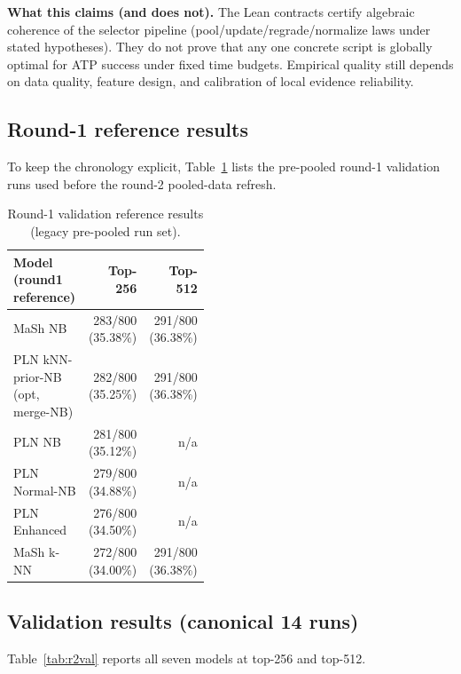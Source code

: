 \documentclass[11pt]{article}
\begin{document}
\noindent
\textbf{What this claims (and does not).}
The Lean contracts certify algebraic coherence of the selector pipeline
(pool/update/regrade/normalize laws under stated hypotheses). They do not prove
that any one concrete script is globally optimal for ATP success under fixed
time budgets. Empirical quality still depends on data quality, feature design,
and calibration of local evidence reliability.

\subsection{Round-1 reference results}
To keep the chronology explicit, Table~\ref{tab:r1val} lists the pre-pooled
round-1 validation runs used before the round-2 pooled-data refresh.

\begin{table}[h]
\centering
\begin{scriptsize}
\begin{tabular}{p{0.44\linewidth}rr}
\hline
Model (round1 reference) & Top-256 & Top-512 \\
\hline
MaSh NB & 283/800 (35.38\%) & 291/800 (36.38\%) \\
PLN kNN-prior-NB (opt, merge-NB) & 282/800 (35.25\%) & 291/800 (36.38\%) \\
PLN NB & 281/800 (35.12\%) & n/a \\
PLN Normal-NB & 279/800 (34.88\%) & n/a \\
PLN Enhanced & 276/800 (34.50\%) & n/a \\
MaSh k-NN & 272/800 (34.00\%) & 291/800 (36.38\%) \\
\hline
\end{tabular}
\end{scriptsize}
\caption{Round-1 validation reference results (legacy pre-pooled run set).}
\label{tab:r1val}
\end{table}

\subsection{Validation results (canonical 14 runs)}
Table~\ref{tab:r2val} reports all seven models at top-256 and top-512.
\end{document}
